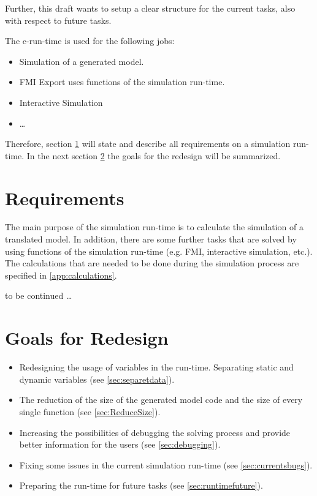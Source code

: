 Further, this draft wants to setup a clear structure for the current tasks,
also with respect to future tasks.

The c-run-time is used for the following jobs:
\begin{itemize}
  \item Simulation of a generated model.
  \item FMI Export uses functions of the simulation run-time\cite{FMI10}.
  \item Interactive Simulation
  \item \ldots
\end{itemize}       

Therefore, section \ref{sec:requirements} will state and describe all
requirements on a simulation run-time. In the next section \ref{sec:goals} the
goals for the redesign will be summarized.


\section{Requirements}\label{sec:requirements}

The main purpose of the simulation run-time is to calculate the simulation of a
translated model. In addition, there are some further tasks that are solved by
using functions of the simulation run-time (e.g. FMI, interactive simulation,
 etc.). The calculations that are needed to be done during the simulation
 process are specified in \ref{app:calculations}.

to be continued \ldots

\section{Goals for Redesign}\label{sec:goals}

\begin{itemize}
  \item Redesigning the usage of variables in the run-time. Separating static
  and dynamic variables (see \ref{sec:separetdata}).
  \item The reduction of the size of the generated model code and the size
  of every single function (see \ref{sec:ReduceSize}).
  \item Increasing the possibilities of debugging the solving process and
  provide better information for the users (see \ref{sec:debugging}).
  \item Fixing some issues in the current simulation run-time (see
  \ref{sec:currentsbugs}).
  \item Preparing the run-time for future tasks (see
  \ref{sec:runtimefuture}).
\end{itemize}

